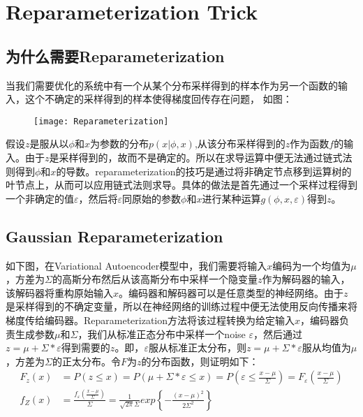 
\chapter{Reparameterization Trick}

\section{为什么需要Reparameterization}
当我们需要优化的系统中有一个从某个分布采样得到的样本作为另一个函数的输入，这个不确定的采样得到的样本使得梯度回传存在问题， 如图：
\begin{figure}[htbp]
\centering
\texttt{[image: Reparameterization]}
\end{figure}

假设$z$是服从以$\phi$和$x$为参数的分布$p(x|\phi, x)$,从该分布采样得到的$z$作为函数$f$的输入。由于$z$是采样得到的，故而不是确定的。所以在求导运算中便无法通过链式法则得到$\phi$和$x$的导数。reparameterization的技巧是通过将非确定节点移到运算树的叶节点上，从而可以应用链式法则求导。具体的做法是首先通过一个采样过程得到一个非确定的值$\varepsilon$，然后将$\varepsilon$同原始的参数$\phi$和$x$进行某种运算$g(\phi, x, \varepsilon)$得到$z$。

\section{Gaussian Reparameterization}
 如下图，在Variational Autoencoder模型中，我们需要将输入$x$编码为一个均值为$\mu$，方差为$\Sigma$的高斯分布然后从该高斯分布中采样一个隐变量$z$作为解码器的输入，该解码器将重构原始输入$x$。编码器和解码器可以是任意类型的神经网络。由于$z$是采样得到的不确定变量，所以在神经网络的训练过程中便无法使用反向传播来将梯度传给编码器。Reparameterization方法将该过程转换为给定输入$x$，编码器负责生成参数$\mu$和$\Sigma$，我们从标准正态分布中采样一个noise $\varepsilon$，然后通过$z=\mu + \Sigma*\varepsilon$得到需要的$z$。即，$\varepsilon$服从标准正太分布，则$z=\mu + \Sigma*\varepsilon$服从均值为$\mu$，方差为$\Sigma$的正太分布。令$F$为$z$的分布函数，则证明如下：
\begin{displaymath}
\begin{split}
F_z(x)&=P(z \leq x) = P(\mu + \Sigma*\varepsilon \leq x)=P(\varepsilon \leq \frac{x-\mu}{\Sigma}) = F_{\varepsilon}(\frac{x-\mu}{\Sigma})\\
f_Z(x) &= \frac{f_{\varepsilon}(\frac{x-\mu}{\Sigma})}{\Sigma} =\frac{1}{\sqrt{2\pi}\Sigma} exp \left\{ -\frac{(x-\mu)^2}{2 \Sigma^2} \right\} 
\end{split}
\end{displaymath}

